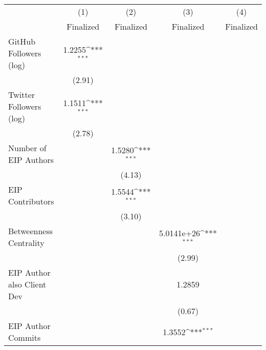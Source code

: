 {
\def\sym#1{\ifmmode^{#1}\else\(^{#1}\)\fi}
\begin{tabular}{l*{4}{c}}
\hline\hline
                                   &\multicolumn{1}{c}{(1)}         &\multicolumn{1}{c}{(2)}         &\multicolumn{1}{c}{(3)}         &\multicolumn{1}{c}{(4)}         \\
                                   &   Finalized         &   Finalized         &   Finalized         &   Finalized         \\
\hline
GitHub Followers (log)             &      1.2255\sym{***}&                     &                     &                     \\
                                   &      (2.91)         &                     &                     &                     \\
[1em]
Twitter Followers (log)            &      1.1511\sym{***}&                     &                     &                     \\
                                   &      (2.78)         &                     &                     &                     \\
[1em]
Number of EIP Authors              &                     &      1.5280\sym{***}&                     &                     \\
                                   &                     &      (4.13)         &                     &                     \\
[1em]
EIP Contributors                   &                     &      1.5544\sym{***}&                     &                     \\
                                   &                     &      (3.10)         &                     &                     \\
[1em]
Betweenness Centrality             &                     &                     &  5.0141e+26\sym{***}&                     \\
                                   &                     &                     &      (2.99)         &                     \\
[1em]
EIP Author also Client Dev         &                     &                     &      1.2859         &                     \\
                                   &                     &                     &      (0.67)         &                     \\
[1em]
EIP Author Commits                 &                     &                     &      1.3552\sym{***}&                     \\

\end{tabular}}

